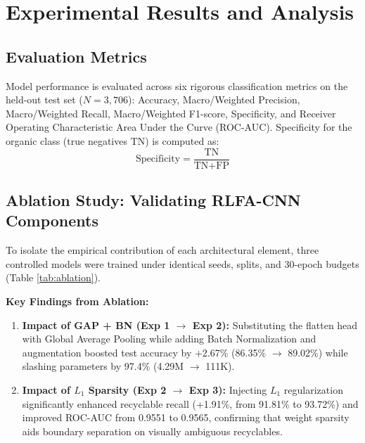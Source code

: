 \documentclass[conference]{IEEEtran}
\begin{document}
\section{Experimental Results and Analysis}

\subsection{Evaluation Metrics}
Model performance is evaluated across six rigorous classification metrics on the held-out test set ($N=3,706$): Accuracy, Macro/Weighted Precision, Macro/Weighted Recall, Macro/Weighted F1-score, Specificity, and Receiver Operating Characteristic Area Under the Curve (ROC-AUC). Specificity for the organic class (true negatives $\text{TN}$) is computed as:
\begin{equation}
\text{Specificity} = \frac{\text{TN}}{\text{TN} + \text{FP}}
\end{equation}

\subsection{Ablation Study: Validating RLFA-CNN Components}
To isolate the empirical contribution of each architectural element, three controlled models were trained under identical seeds, splits, and 30-epoch budgets (Table \ref{tab:ablation}).

\begin{table}[htbp]
\caption{Systematic Ablation Study on Test Set Performance}
\label{tab:ablation}
\centering
{}
\end{table}

\textbf{Key Findings from Ablation:}
\begin{enumerate}
    \item \textbf{Impact of GAP + BN (Exp 1 $\rightarrow$ Exp 2):} Substituting the flatten head with Global Average Pooling while adding Batch Normalization and augmentation boosted test accuracy by +2.67\% (86.35\% $\rightarrow$ 89.02\%) while slashing parameters by 97.4\% (4.29M $\rightarrow$ 111K).
    \item \textbf{Impact of $L_1$ Sparsity (Exp 2 $\rightarrow$ Exp 3):} Injecting $L_1$ regularization significantly enhanced recyclable recall (+1.91\%, from 91.81\% to 93.72\%) and improved ROC-AUC from 0.9551 to 0.9565, confirming that weight sparsity aids boundary separation on visually ambiguous recyclables.
\end{enumerate}
\end{document}
